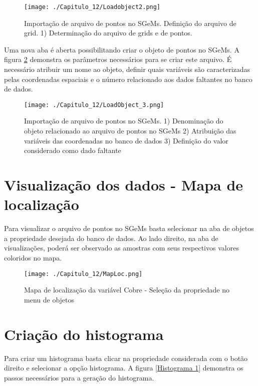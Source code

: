 \FloatBarrier
\begin{figure}[h]
	\centering
	\texttt{[image: ./Capitulo\_12/Loadobject2.png]}	
	\caption{ Importação de arquivo de pontos no SGeMs. Definição do arquivo de grid. 1) Determinação do arquivo de grids e de pontos.}
	\label{Carregar objeto_2}
\end{figure}
\FloatBarrier

Uma nova aba é aberta possibilitando criar o objeto de pontos no SGeMs. A figura \ref{Carregar objeto_3} demonstra os parâmetros necessários para se criar este arquivo. É necessário atribuir um nome ao objeto, definir quais variáveis são caracterizadas pelas coordenadas espaciais e o número relacionado aos dados faltantes no banco de dados. 

\FloatBarrier
\begin{figure}[h]
	\centering
	\texttt{[image: ./Capitulo\_12/LoadObject\_3.png]}	
	\caption{ Importação de arquivo de pontos no SGeMs. 1) Denominação do objeto relacionado ao arquivo de pontos no SGeMs 2) Atribuição das variáveis das coordenadas no banco de dados 3) Definição do valor considerado como dado faltante }
	\label{Carregar objeto_3}
\end{figure}
\FloatBarrier

\section{Visualização dos dados - Mapa de localização}

Para visualizar o arquivo de pontos no SGeMs basta selecionar na aba de objetos a propriedade desejada do banco de dados. Ao lado direito, na aba de visualizações, poderá ser observado as amostras com seus respectivos valores coloridos no mapa.

\FloatBarrier
\begin{figure}[h]
	\centering
	\texttt{[image: ./Capitulo\_12/MapLoc.png]}	
	\caption{ Mapa de localização da variável Cobre - Seleção da propriedade no menu de objetos }
	\label{Mapa de localizacao}
\end{figure}
\FloatBarrier

\section{Criação do histograma}

Para criar um histograma basta clicar na propriedade considerada com o botão direito e selecionar a opção histograma. A figura \ref{Histograma 1} demonstra os passos necessários para a geração do histograma. 

